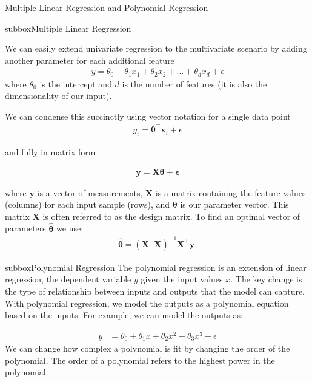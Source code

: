 \begin{textbox}{\href{https://compneuro.neuromatch.io/tutorials/W1D2_ModelFitting/student/W1D2_Tutorial4.html}{Multiple Linear Regression and Polynomial Regression }   }
\begin{subbox}{subbox}{Multiple Linear Regression}
\scriptsize

We can easily extend univariate regression to the multivariate scenario by adding another parameter for each additional feature
\begin{align}
y = \theta_0 + \theta_1 x_1 + \theta_2 x_2 + ... +\theta_d x_d + \epsilon
\end{align}
where $\theta_0$ is the intercept and $d$ is the number of features (it is also the dimensionality of our input).

We can condense this succinctly using vector notation for a single data point
\begin{align}
y_i = \boldsymbol{\theta}^{\top}\mathbf{x}_i + \epsilon
\end{align}

and fully in matrix form

\begin{align}
\mathbf{y} = \mathbf{X}\boldsymbol{\theta} + \mathbf{\epsilon}
\end{align}

where $\mathbf{y}$ is a vector of measurements, $\mathbf{X}$ is a matrix containing the feature values (columns) for each input sample (rows), and $\boldsymbol{\theta}$ is our parameter vector.
This matrix $\mathbf{X}$ is often referred to as the design matrix.
To find an optimal vector of parameters $\boldsymbol{\hat\theta}$ we use:
\begin{align}
\boldsymbol{\hat\theta} = (\mathbf{X}^\top\mathbf{X})^{-1}\mathbf{X}^\top\mathbf{y}.
\end{align}
\end{subbox}
\begin{subbox}{subbox}{Polynomial Regression}
\scriptsize
The polynomial regression is an extension of linear regression, the dependent variable $y$ given the input values $x$. The key change is the type of relationship between inputs and outputs that the model can capture.
With polynomial regression, we model the outputs as a polynomial equation based on the inputs. For example, we can model the outputs as:

\begin{align}
y & = \theta_0 + \theta_1 x + \theta_2 x^2 + \theta_3 x^3 + \epsilon
\end{align}
We can change how complex a polynomial is fit by changing the order of the polynomial. The order of a polynomial refers to the highest power in the polynomial. 


\end{subbox}
\end{textbox}

